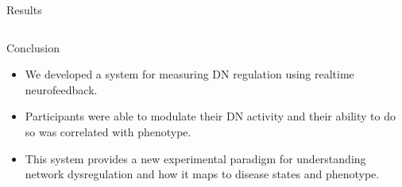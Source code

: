 \documentclass[final,hyperref={pdfpagelabels=false}]{beamer}
\begin{document}
\begin{frame}
\begin{columns}
\begin{column}{.5\textwidth}
{\begin{block}{Results}
\begin{column}{.49\textwidth}
              \end{column}
            \end{block}
            \begin{block}{Conclusion}
              \begin{itemize}
                   \item We developed a system for measuring DN regulation using realtime neurofeedback. 
                   \item Participants were able to modulate their DN activity and their ability to do so was correlated with phenotype. 
                   \item This system provides a new experimental paradigm for understanding network dysregulation and how it maps to 
                        disease states and phenotype.
              \end{itemize}
            \end{block}
          }
    \end{column}
  \end{columns}
\end{frame}
\end{document}

